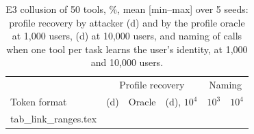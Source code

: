 \documentclass[10pt]{article}
\begin{document}
\begin{table}[t]\centering\caption{E3 collusion of 50 tools, \%, mean [min--max] over 5 seeds: profile recovery by attacker (d) and by the profile oracle at 1{,}000 users, (d) at 10{,}000 users, and naming of calls when one tool per task learns the user's identity, at 1{,}000 and 10{,}000 users.}\label{tab:linkranges}
\footnotesize\setlength{\tabcolsep}{3pt}
\begin{tabular}{@{}lrrrrr@{}}\toprule & \multicolumn{3}{c}{Profile recovery} & \multicolumn{2}{c}{Naming}\\ Token format & (d) & Oracle & (d), $10^4$ & $10^3$ & $10^4$\\\midrule
{} tab_link_ranges.tex \end{tabular}\end{table}
\end{document}
